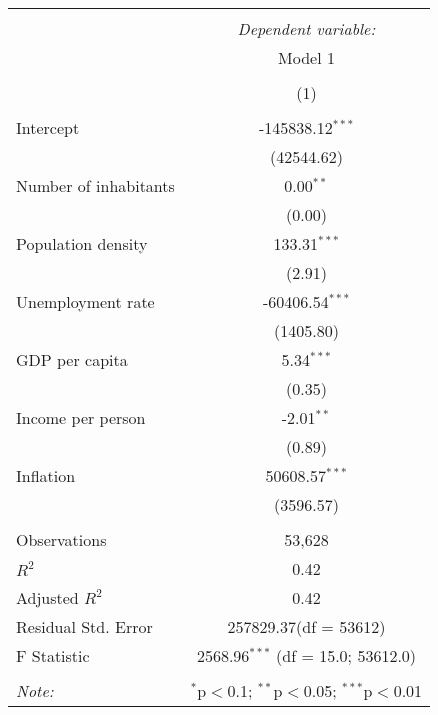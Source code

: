 \begin{table}[!htbp] \centering
\begin{tabular}{@{\extracolsep{5pt}}lc}
\\[-1.8ex]\hline
\hline \\[-1.8ex]
& \multicolumn{1}{c}{\textit{Dependent variable:}} \
\cr \cline{1-2}
\\[-1.8ex] & \multicolumn{1}{c}{Model 1} \\\\[-1.8ex] & (1) \\
\hline \\[-1.8ex]
 Intercept & -145838.12$^{***}$ \\
  & (42544.62) \\
 Number of inhabitants & 0.00$^{**}$ \\
  & (0.00) \\
 Population density & 133.31$^{***}$ \\
  & (2.91) \\
 Unemployment rate & -60406.54$^{***}$ \\
  & (1405.80) \\
 GDP per capita & 5.34$^{***}$ \\
  & (0.35) \\
 Income per person & -2.01$^{**}$ \\
  & (0.89) \\
 Inflation & 50608.57$^{***}$ \\
  & (3596.57) \\
\hline \\[-1.8ex]
 Observations & 53,628 \\
 $R^2$ & 0.42 \\
 Adjusted $R^2$ & 0.42 \\
 Residual Std. Error & 257829.37(df = 53612)  \\
 F Statistic & 2568.96$^{***}$ (df = 15.0; 53612.0) \\
\hline
\hline \\[-1.8ex]
\textit{Note:} & \multicolumn{1}{r}{$^{*}$p$<$0.1; $^{**}$p$<$0.05; $^{***}$p$<$0.01} \\
\end{tabular}
\end{table}